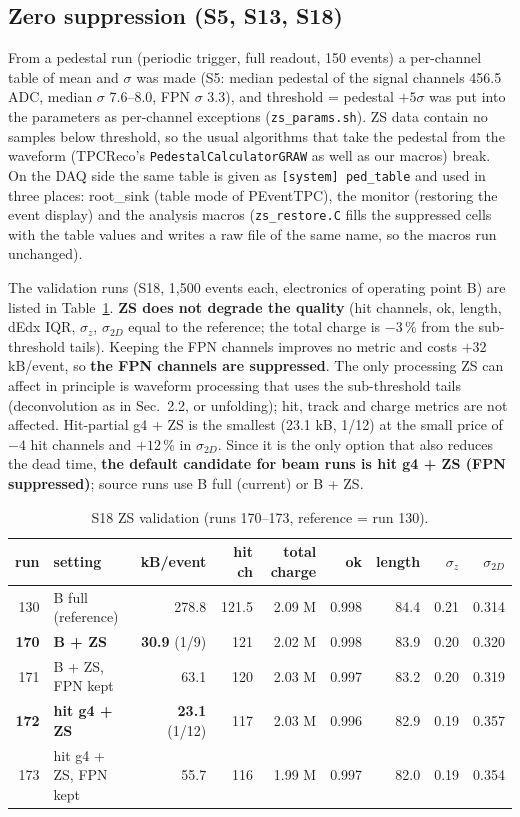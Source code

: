 \documentclass[a4paper,11pt]{article}
\begin{document}
\subsection{Zero suppression (S5, S13, S18)}
From a pedestal run (periodic trigger, full readout, 150 events) a per-channel table of mean and $\sigma$ was made (S5: median pedestal of the signal channels 456.5 ADC, median $\sigma$ 7.6--8.0, FPN $\sigma$ 3.3),
and threshold = pedestal $+ 5\sigma$ was put into the parameters as per-channel exceptions (\texttt{zs\_params.sh}).
ZS data contain no samples below threshold, so the usual algorithms that take the pedestal from the waveform (TPCReco's \texttt{PedestalCalculatorGRAW} as well as our macros) break.
On the DAQ side the same table is given as \texttt{[system] ped\_table} and used in three places: root\_sink (table mode of PEventTPC), the monitor (restoring the event display) and the analysis macros (\texttt{zs\_restore.C} fills the suppressed cells with the table values and writes a raw file of the same name, so the macros run unchanged).

The validation runs (S18, 1,500 events each, electronics of operating point B) are listed in Table~\ref{tab:zs}.
\textbf{ZS does not degrade the quality} (hit channels, ok, length, dEdx IQR, $\sigma_z$, $\sigma_{2D}$ equal to the reference; the total charge is $-3$\,\% from the sub-threshold tails).
Keeping the FPN channels improves no metric and costs $+32$ kB/event, so \textbf{the FPN channels are suppressed}.
The only processing ZS can affect in principle is waveform processing that uses the sub-threshold tails (deconvolution as in Sec.~2.2, or unfolding); hit, track and charge metrics are not affected.
Hit-partial g4 + ZS is the smallest (23.1 kB, 1/12) at the small price of $-4$ hit channels and $+12$\,\% in $\sigma_{2D}$. Since it is the only option that also reduces the dead time,
\textbf{the default candidate for beam runs is hit g4 + ZS (FPN suppressed)}; source runs use B full (current) or B + ZS.

\begin{table}[h]\centering\small
\caption{S18 ZS validation (runs 170--173, reference = run 130).}
\label{tab:zs}
\footnotesize
\begin{tabular}{rlrrrrrrr}
\toprule
run & setting & kB/event & hit ch & total charge & ok & length & $\sigma_z$ & $\sigma_{2D}$ \\
\midrule
130 & B full (reference) & 278.8 & 121.5 & 2.09 M & 0.998 & 84.4 & 0.21 & 0.314 \\
\textbf{170} & \textbf{B + ZS} & \textbf{30.9} (1/9) & 121 & 2.02 M & 0.998 & 83.9 & 0.20 & 0.320 \\
171 & B + ZS, FPN kept & 63.1 & 120 & 2.03 M & 0.997 & 83.2 & 0.20 & 0.319 \\
\textbf{172} & \textbf{hit g4 + ZS} & \textbf{23.1} (1/12) & 117 & 2.03 M & 0.996 & 82.9 & 0.19 & 0.357 \\
173 & hit g4 + ZS, FPN kept & 55.7 & 116 & 1.99 M & 0.997 & 82.0 & 0.19 & 0.354 \\
\bottomrule
\end{tabular}
\end{table}
\end{document}
